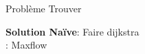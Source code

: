 \begin{frame}
    \frametitle{\problemtitle}
    \begin{block}
        {Problème} Trouver 
    \end{block}
    \pause
    \textbf{Solution Naïve}: Faire dijkstra \\
    : Maxflow
\end{frame}
